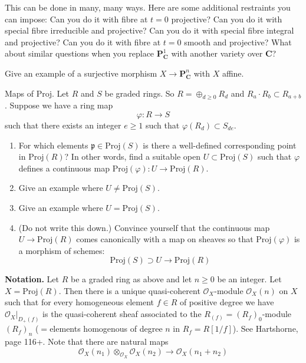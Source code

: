 \begin{remark}
This can be done in many, many ways. Here are some additional restraints
you can impose: Can you do it with fibre at $t=0$ projective? Can you do it
with special fibre irreducible and projective? Can you do it with special
fibre integral and projective? Can you do it with fibre at $t=0$ smooth and
projective? What about similar questions when you replace
${\mathbf P}^1_{\mathbf C}$ with another variety over ${\mathbf C}$?
\end{remark}

\begin{exercise}
Give an example of a surjective morphism
$X \to {\mathbf P}^n_{\mathbf C}$ with $X$ affine.
\end{exercise}

\begin{exercise}
Maps of $\text{Proj}$. Let $R$ and $S$ be graded rings. So
$R = \oplus_{d \geq 0} R_d$ and $R_a \cdot R_b \subset R_{a+b}$.
Suppose we have a ring map
$$
\varphi : R \to S
$$
such that there exists an integer $e \geq 1$ such that
$\varphi( R_d ) \subset S_{de}$.
\begin{enumerate}
\item For which elements $\mathfrak p \in \text{Proj}(S)$ is
there a well-defined corresponding point in $\text{Proj}(R)$? In other words,
find a suitable open $U \subset \text{Proj}(S)$ such that $\varphi$ defines
a continuous map $\text{Proj}(\varphi) : U \to \text{Proj}(R)$.
\item Give an example where $U \not = \text{Proj}(S)$.
\item Give an example where $U = \text{Proj}(S)$.
\item (Do not write this down.) Convince yourself that 
the continuous map $U \to \text{Proj}(R)$ comes canonically with
a map on sheaves so that $\text{Proj}(\varphi)$ is a morphism of schemes:
$$
\text{Proj}(S) \supset U \longrightarrow \text{Proj}(R)
$$
\end{enumerate}
\end{exercise}

\noindent
{\bf Notation.} Let $R$ be a graded ring as above and
let $n \geq 0$ be an integer. Let $X = \text{Proj}(R)$. Then there is a unique
quasi-coherent ${\mathcal O}_X$-module ${\mathcal O}_X(n)$ on $X$ such that
for every homogeneous element $f \in R$ of positive degree we have
${\mathcal O}_X |_{D_{+}(f)}$ is the quasi-coherent sheaf associated to the
$R_{(f)} = (R_f)_0$-module $(R_f)_n$ ($=$elements homogenous of degree
$n$ in $R_f = R[1/f]$). See Hartshorne, page 116+. Note that there are
natural maps
$$
{\mathcal O}_X(n_1) \otimes_{{\mathcal O}_X} {\mathcal O}_X(n_2)
\longrightarrow
{\mathcal O}_X(n_1+n_2)
$$

